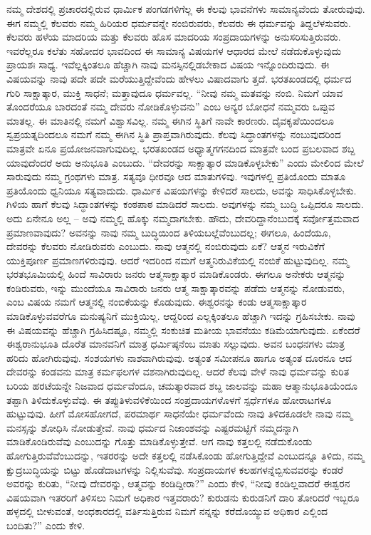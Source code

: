 ನಮ್ಮ ದೇಶದಲ್ಲಿ ಪ್ರಚಾರದಲ್ಲಿರುವ ಧಾರ್ಮಿಕ ಪಂಗಡಗಳಿಗೆಲ್ಲ ಈ ಕೆಲವು ಭಾವನೆಗಳು ಸಾಮಾನ್ಯವೆಂದು ತೋರುವುವು. ಈಗ ನಮ್ಮಲ್ಲಿ ಕೆಲವರು ನಮ್ಮ ಹಿರಿಯರ ಧರ್ಮವನ್ನೇ ನಂಬಿರುವರು, ಕೆಲವರು ಈ ಧರ್ಮವನ್ನು ತಿದ್ದಲೆಳಸುವರು. ಕೆಲವರು ಹಳೆಯ ಮಾದರಿಯ ಮತ್ತು ಕೆಲವರು ಹೊಸ ಮಾದರಿಯ ಸಂಪ್ರದಾಯಗಳನ್ನು ಅನುಸರಿಸುತ್ತಿರುವರು. ಇವರೆಲ್ಲರೂ ಕಲೆತು ಸಹೋದರ ಭಾವದಿಂದ ಈ ಸಾಮಾನ್ಯ ವಿಷಯಗಳ ಆಧಾರದ ಮೇಲೆ ನಡೆದುಕೊಳ್ಳುವುದು ಪ್ರಾಯಶಃ ಸಾಧ್ಯ. ಇವೆಲ್ಲಕ್ಕಿಂತಲೂ ಹೆಚ್ಚಾಗಿ ನಾವು ಮನಸ್ಸಿನಲ್ಲಿಡಬೇಕಾದ ವಿಷಯ ಇನ್ನೊಂದಿರುವುದು. ಈ ವಿಷಯವನ್ನು ನಾವು ಪದೇ ಪದೇ ಮರೆಯುತ್ತಿದ್ದೇವೆಂದು ಹೇಳಲು ವಿಷಾದವಾಗು ತ್ತದೆ. ಭರತಖಂಡದಲ್ಲಿ ಧರ್ಮದ ಗುರಿ ಸಾಕ್ಷಾತ್ಕಾರ, ಮುಕ್ತಿ ಸಾಧನೆ; ಮತ್ತಾವುದೂ ಧರ್ಮವಲ್ಲ. “ನೀವು ನಮ್ಮ ಮತವನ್ನು ನಂಬಿ. ನಿಮಗೆ ಯಾವ ತೊಂದರೆಯೂ ಬಾರದಂತೆ ನಮ್ಮ ದೇವರು ನೋಡಿಕೊಳ್ಳುವನು” ಎಂಬ ಅನ್ಯರ ಬೋಧನೆ ನಮ್ಮವರು ಒಪ್ಪುವ ಮಾತಲ್ಲ. ಈ ಮಾತಿನಲ್ಲಿ ನಮಗೆ ವಿಶ್ವಾಸವಿಲ್ಲ. ನಮ್ಮ ಈಗಿನ ಸ್ಥಿತಿಗೆ ನಾವೇ ಕಾರಣರು. ದೈವಕೃಪೆಯಿಂದಲೂ ಸ್ವಪ್ರಯತ್ನದಿಂದಲೂ ನಮಗೆ ನಮ್ಮ ಈಗಿನ ಸ್ಥಿತಿ ಪ್ರಾಪ್ತವಾಗಿರುವುದು. ಕೆಲವು ಸಿದ್ಧಾಂತಗಳನ್ನು ನಂಬುವುದರಿಂದ ಮಾತ್ರವೇ ಏನೂ ಪ್ರಯೋಜನವಾಗುವುದಿಲ್ಲ. ಭರತಖಂಡದ ಅಧ್ಯಾತ್ಮಗಗನದಿಂದ ಮಾತ್ರವೇ ಬಂದ ಪ್ರಬಲವಾದ ಶಬ್ದ ಯಾವುದೆಂದರೆ ಅದು ಅನುಭೂತಿ ಎಂಬುದು. “ದೇವರನ್ನು ಸಾಕ್ಷಾತ್ಕಾರ ಮಾಡಿಕೊಳ್ಳಬೇಕು” ಎಂದು ಮೇಲಿಂದ ಮೇಲೆ ಸಾರುವುದು ನಮ್ಮ ಗ್ರಂಥಗಳು ಮಾತ್ರ. ಸತ್ಯವೂ ಧೀರವೂ ಆದ ಮಾತುಗಳಿವು. ಇವುಗಳಲ್ಲಿ ಪ್ರತಿಯೊಂದು ಮಾತೂ ಪ್ರತಿಯೊಂದು ಧ್ವನಿಯೂ ಸತ್ಯವಾದುದು. ಧಾರ್ಮಿಕ ವಿಷಯಗಳನ್ನು ಕೇಳಿದರೆ ಸಾಲದು, ಅವನ್ನು ಸಾಧಿಸಿಕೊಳ್ಳಬೇಕು. ಗಿಳಿಯ ಹಾಗೆ ಕೆಲವು ಸಿದ್ಧಾಂತಗಳನ್ನು ಕಂಠಪಾಠ ಮಾಡಿದರೆ ಸಾಲದು. ಅವುಗಳನ್ನು ನಮ್ಮ ಬುದ್ಧಿ ಒಪ್ಪಿದರೂ ಸಾಲದು. ಅದು ಏನೇನೂ ಅಲ್ಲ – ಅವು ನಮ್ಮಲ್ಲಿ ಹೊಕ್ಕು ನಮ್ಮದಾಗಬೇಕು. ಹೌದು, ದೇವರಿದ್ದಾನೆಂಬುದಕ್ಕೆ ಸರ್ವೋತ್ತಮವಾದ ಪ್ರಮಾಣವಾವುದು? ಅವನನ್ನು ನಾವು ನಮ್ಮ ಬುದ್ಧಿಯಿಂದ ತಿಳಿಯಬಲ್ಲೆವೆಂಬುದಲ್ಲ; ಈಗಲೂ, ಹಿಂದೆಯೂ, ದೇವರನ್ನು ಕೆಲವರು ನೋಡಿರುವರು ಎಂಬುದು. ನಾವು ಆತ್ಮನಲ್ಲಿ ನಂಬಿರುವುದು ಏಕೆ? ಆತ್ಮನ ಇರುವಿಕೆಗೆ ಯುಕ್ತಿಪೂರ್ಣ ಪ್ರಮಾಣಗಳಿರುವುವು. ಆದರೆ ಇದರಿಂದ ನಮಗೆ ಆತ್ಮನಿರುವಿಕೆಯಲ್ಲಿ ನಂಬಿಕೆ ಹುಟ್ಟುವುದಿಲ್ಲ. ನಮ್ಮ ಭರತಭೂಮಿಯಲ್ಲಿ ಹಿಂದೆ ಸಾವಿರಾರು ಜನರು ಆತ್ಮಸಾಕ್ಷಾತ್ಕಾರ ಮಾಡಿಕೊಂಡರು. ಈಗಲೂ ಅನೇಕರು ಆತ್ಮನನ್ನು ಕಂಡಿರುವರು, ಇನ್ನು ಮುಂದೆಯೂ ಸಾವಿರಾರು ಜನರು ಆತ್ಮ ಸಾಕ್ಷಾತ್ಕಾರವನ್ನು ಪಡೆದು ಆತ್ಮನನ್ನು ನೋಡುವರು, ಎಂಬ ವಿಷಯ ನಮಗೆ ಆತ್ಮನಲ್ಲಿ ನಂಬಿಕೆಯನ್ನು ಕೊಡುವುದು. ಈಶ್ವರನನ್ನು ಕಂಡು ಆತ್ಮಸಾಕ್ಷಾತ್ಕಾರ ಮಾಡಿಕೊಳ್ಳುವವರೆಗೂ ಮನುಷ್ಯನಿಗೆ ಮುಕ್ತಿಯಿಲ್ಲ. ಆದ್ದರಿಂದ ಎಲ್ಲಕ್ಕಿಂತಲೂ ಹೆಚ್ಚಾಗಿ ಇದನ್ನು ಗ್ರಹಿಸಬೇಕು. ನಾವು ಈ ವಿಷಯವನ್ನು ಹೆಚ್ಚಾಗಿ ಗ್ರಹಿಸಿದಷ್ಟೂ, ನಮ್ಮಲ್ಲಿ ಸಂಕುಚಿತ ಮತೀಯ ಭಾವನೆಯು ಕಡಿಮೆಯಾಗುವುದು. ಏಕೆಂದರೆ ಈಶ್ವರಾನುಭೂತಿ ದೊರೆತ ಮಾನವನಿಗೆ ಮಾತ್ರ ಧರ್ಮಿಷ್ಠನೆಂಬ ಮಾತು ಸಲ್ಲುವುದು. ಅವನ ಬಂಧನಗಳು ಮಾತ್ರ ಹರಿದು ಹೋಗಿರುವುವು. ಸಂಶಯಗಳು ನಾಶವಾಗಿರುವುವು. ಅತ್ಯಂತ ಸಮೀಪನೂ ಹಾಗೂ ಅತ್ಯಂತ ದೂರನೂ ಆದ ದೇವರನ್ನು ಕಂಡವನು ಮಾತ್ರ ಕರ್ಮಫಲಗಳ ವಶನಾಗಿರುವುದಿಲ್ಲ. ಆದರೆ ಕೆಲವು ವೇಳೆ ನಾವು ಧರ್ಮವನ್ನು ಕುರಿತ ಬರಿಯ ಹರಟೆಯನ್ನೇ ನಿಜವಾದ ಧರ್ಮವೆಂದೂ, ಚಮತ್ಕಾರವಾದ ಶಬ್ದ ಜಾಲವನ್ನು ಮಹಾ ಆತ್ಮಾನುಭೂತಿಯೆಂದೂ ತಪ್ಪಾಗಿ ತಿಳಿದುಕೊಳ್ಳುವೆವು. ಈ ತಪ್ಪು\break ತಿಳುವಳಿಕೆಯಿಂದ ಸಂಪ್ರದಾಯಗಳೊಳಗೆ ಸ್ಪರ್ಧೆಗಳೂ ಹೋರಾಟಗಳೂ ಹುಟ್ಟುವುವು. ಹೀಗೆ ಮೋಸಹೋಗದೆ, ಪರಮಾರ್ಥ ಸಾಧನೆಯೇ ಧರ್ಮವೆಂದು ನಾವು ತಿಳಿದಕೂಡಲೇ ನಾವು ನಮ್ಮ ಮನಸ್ಸನ್ನು ಶೋಧಿಸಿ ನೋಡುತ್ತೇವೆ. ನಾವು ಧರ್ಮದ ನಿಜಾಂಶವನ್ನು ಎಷ್ಟರಮಟ್ಟಿಗೆ ನಮ್ಮದನ್ನಾಗಿ ಮಾಡಿಕೊಂಡಿರುವೆವು ಎಂಬುದನ್ನು ಗೊತ್ತು ಮಾಡಿಕೊಳ್ಳುತ್ತೇವೆ. ಆಗ ನಾವು ಕತ್ತಲಲ್ಲಿ ನಡೆದುಕೊಂಡು ಹೋಗುತ್ತಿರುವೆವೆಂಬುದನ್ನು, ಇತರರನ್ನು ಅದೇ ಕತ್ತಲಲ್ಲಿ ನಡೆಸಿಕೊಂಡು ಹೋಗುತ್ತಿದ್ದೇವೆ ಎಂಬುದನ್ನೂ ತಿಳಿದು, ನಮ್ಮ ಕ್ಷುದ್ರಬುದ್ಧಿಯನ್ನು ಬಿಟ್ಟು ಹೊಡೆದಾಟಗಳನ್ನು ನಿಲ್ಲಿಸುವೆವು. ಸಂಪ್ರದಾಯಗಳ ಕಲಹಗಳನ್ನೆಬ್ಬಿಸುವವರನ್ನು ಕಂಡರೆ ಅವರನ್ನು ಕುರಿತು, “ನೀವು ದೇವರನ್ನು, ಆತ್ಮವನ್ನು ಕಂಡಿದ್ದೀರಾ?” ಎಂದು ಕೇಳಿ, “ನೀವು ಕಂಡಿಲ್ಲವಾದರೆ ಈಶ್ವರನ ವಿಷಯವಾಗಿ ಇತರರಿಗೆ ತಿಳಿಸಲು ನಿಮಗೆ ಅಧಿಕಾರ ಇತ್ತವರಾರು? ಕುರುಡನು ಕುರುಡನಿಗೆ ದಾರಿ ತೋರಿದರೆ ಇಬ್ಬರೂ ಹಳ್ಳದಲ್ಲಿ ಬೀಳುವಂತೆ, ಅಂಧಕಾರದಲ್ಲಿ ವರ್ತಿಸುತ್ತಿರುವ ನಿಮಗೆ ನನ್ನನ್ನು ಕರೆದೊಯ್ಯುವ ಅಧಿಕಾರ ಎಲ್ಲಿಂದ ಬಂದಿತು?” ಎಂದು ಕೇಳಿ.

